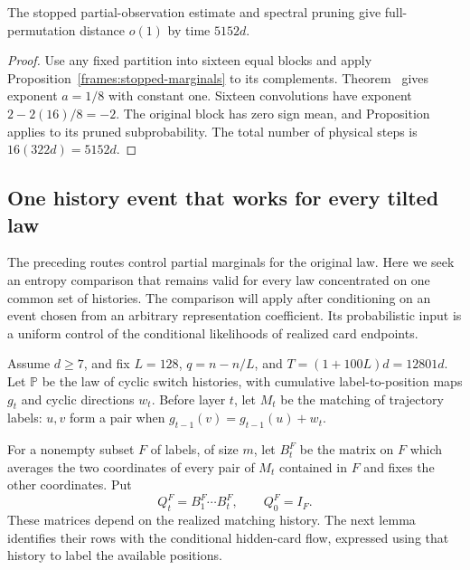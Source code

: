 \begin{proposition}
\label{frames:pruning-application}
The stopped partial-observation estimate and spectral pruning give
full-permutation distance $o(1)$ by time $5152d$.
\end{proposition}

\begin{proof}
Use any fixed partition into sixteen equal blocks and apply
Proposition~\ref{frames:stopped-marginals} to its complements.
Theorem~ gives exponent $a=1/8$ with
constant one. Sixteen convolutions have exponent
$2-2(16)/8=-2$. The original block has zero sign mean, and
Proposition~ applies to its pruned subprobability.
The total number of physical steps is $16(322d)=5152d$.
\end{proof}

\subsection{One history event that works for every tilted law}
\label{frames:entropy-section}

{
The preceding routes control partial marginals for the original law.
Here we seek an entropy comparison that remains valid for every law
concentrated on one common set of histories. The comparison will apply
after conditioning on an event chosen from an arbitrary representation
coefficient. Its probabilistic input is a uniform control of the
conditional likelihoods of realized card endpoints.\par}

Assume $d\ge7$, and fix $L=128$, $q=n-n/L$, and
$T=(1+100L)d=12801d$. Let $\mathbb P$ be the law of cyclic switch
histories, with cumulative label-to-position maps $g_t$ and cyclic
directions $w_t$. Before layer $t$, let $M_t$ be the matching of
trajectory labels: $u,v$ form a pair when
$g_{t-1}(v)=g_{t-1}(u)+w_t$.

For a nonempty subset $F$ of labels, of size $m$, let $B_t^F$ be the
matrix on $F$ which averages the two coordinates of every pair of $M_t$
contained in $F$ and fixes the other coordinates. Put
\[
 Q_t^F=B_1^F\cdots B_t^F,\qquad Q_0^F=I_F.
\]
These matrices depend on the realized matching history. The next lemma
identifies their rows with the conditional hidden-card flow, expressed
using that history to label the available positions.


